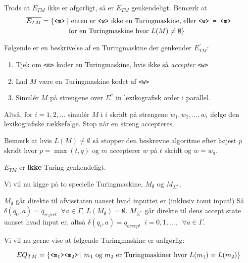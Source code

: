 Trods at $E_{TM}$ ikke er afgørligt, så er $\overline{E_{TM}}$ genkendeligt. Bemærk at
\begin{align*}
	\overline{E_{TM}} = \{  \text{\texttt{<m>}} \mid & \text{  enten er \texttt{<w>}  ikke en Turingmaskine, eller \texttt{<w> = <m>}} \\
	                                                 & \text{for en Turingmaskine hvor } L(M) \ne \emptyset\}
\end{align*}

Følgende er en beskrivelse af en Turingmaskine der genkender $\overline{E_{TM}}$:
\begin{enumerate}
	\item Tjek om \texttt{<m>} koder en Turingmaskine, hvis ikke så \textit{accepter} \texttt{<w>}
	\item Lad $M$ være en Turingmaskine kodet af \texttt{<w>}
	\item Simulér $M$ på strengene over $\Sigma^{*}$ in lexikografisk order i parallel.
\end{enumerate}

Altså, for $i = 1, 2, \ldots$ simulér $M$ i $i$ skridt på strengene $w_{1}, w_{2} , \ldots, w_{i}$ ifølge den lexikografiske rækkefølge. Stop når en streng accepteres.

Bemærk at hvis $L(M) \neq \emptyset$ så stopper den beskrevne algoritme efter højest $p$ skridt hvor $p = \max (t,q)$ og $m$ accepterer $w$ på $t$ skridt og $w = w_{q}$.

\begin{corollary}
	$E_{TM}$ er \textbf{ikke} Turing-genkendeligt.
\end{corollary}

Vi vil nu kigge på to specielle Turingmaskine, $M_{\emptyset}$ og $M_{\Sigma^{*}}$.

$M_{\emptyset}$ går direkte til afvisstaten uanset hvad inputtet er (inklusiv tomt input!) Så $\delta(q_{0}, a) = q_{reject} \;\; \forall a \in \Gamma$, $L(M_{\emptyset}) = \emptyset$.
$M_{\Sigma^{*}}$ går direkte til dens accept state uanset hvad input er, altså $\delta(q_{i}, a) = q_{accept} \;\; i = 0, 1, \ldots, \; \; \forall a \in \Gamma$.

Vi vil nu gerne vise at følgende Turingmaskine er uafgørlig:

\begin{equation*}
	EQ_{TM} = \{\text{\texttt{<m$_1$><m$_2$>}} \mid m_{1} \text{ og } m_{2} \text{ er Turingmaskiner hvor } L(m_{1}) = L(m_{2})\}
\end{equation*}

